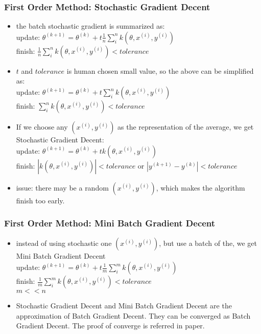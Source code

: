 \begin{frame}
\frametitle{First Order Method: Stochastic Gradient Decent}
	\small
	\begin{itemize}
		\item the batch stochastic gradient is summarized as:\\
		\hspace{1cm} update: $\theta^{(k+1)}=\theta^{(k)}+t\frac{1}{n}\sum_i^n k(\theta,x^{(i)},y^{(i)})$\\
		\hspace{1cm} finish: $\frac{1}{n}\sum_i^n k(\theta,x^{(i)},y^{(i)}) < tolerance$ 
		\item $t$ and $tolerance$ is human chosen small value, so the above can be simplified as: \\
		\hspace{1cm} update: $\theta^{(k+1)}=\theta^{(k)}+t\sum_i^n k(\theta,x^{(i)},y^{(i)})$\\
		\hspace{1cm} finish: $\sum_i^n k(\theta,x^{(i)},y^{(i)}) < tolerance$ 
		\item If we choose any $(x^{(i)},y^{(i)})$ as the representation of the average, we get Stochastic Gradient Decent:\\
		\hspace{1cm} update: $\theta^{(k+1)}=\theta^{(k)}+tk(\theta,x^{(i)},y^{(i)})$\\
		\hspace{1cm} finish: $|k(\theta,x^{(i)},y^{(i)})| < tolerance$ or $|y^{(k+1)}-y^{(k)}|<tolerance$
		\item issue: there may be a random $(x^{(i)},y^{(i)})$, which makes the algorithm finish too early. 
	\end{itemize}
\end{frame}
\begin{frame}
\frametitle{First Order Method: Mini Batch Gradient Decent}
	\small
	\begin{itemize}
		\item instead of using stochastic one $(x^{(i)},y^{(i)})$, but use a batch of the, we get Mini Batch Gradient Decent \\
		\hspace{1cm} update: $\theta^{(k+1)}=\theta^{(k)}+t\frac{1}{m}\sum_i^m k(\theta,x^{(i)},y^{(i)})$\\
		\hspace{1cm} finish: $\frac{1}{m}\sum_i^m k(\theta,x^{(i)},y^{(i)}) < tolerance$ \\
		\hspace{1cm} $m << n$
		\item Stochastic Gradient Decent and Mini Batch Gradient Decent are the approximation of Batch Gradient Decent. They can be converged as Batch Gradient Decent. The proof of converge is referred in paper.
	\end{itemize}
\end{frame}
